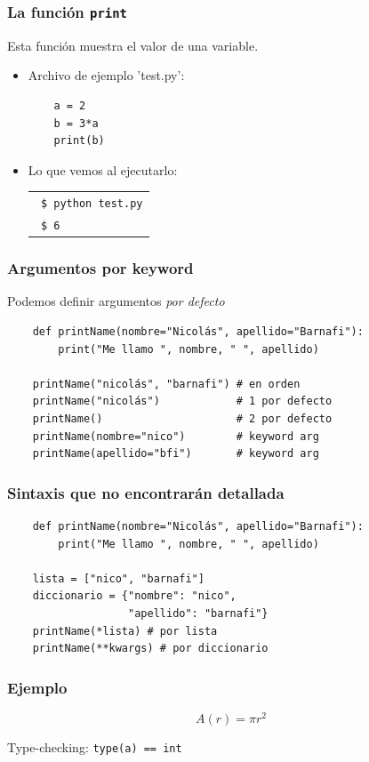 \documentclass[14pt,aspectratio=169,xcolor=dvipsnames]{beamer}
\begin{document}
\begin{frame}[fragile]\frametitle{La función \texttt{print}}
Esta función muestra el valor de una variable. 
\begin{itemize}
    \item Archivo de ejemplo 'test.py':
    \begin{verbatim}
    a = 2
    b = 3*a
    print(b)
    \end{verbatim}
    \item Lo que vemos al ejecutarlo: 

        \begin{tabular}{l}
            \texttt{ \$ python test.py} \\
            \texttt{ \$ 6}
        \end{tabular}
\end{itemize}

\end{frame}
\begin{frame}[fragile]\frametitle{Argumentos por keyword}
    Podemos definir argumentos \emph{por defecto}
    \begin{verbatim}
    def printName(nombre="Nicolás", apellido="Barnafi"):
        print("Me llamo ", nombre, " ", apellido)

    printName("nicolás", "barnafi") # en orden
    printName("nicolás")            # 1 por defecto
    printName()                     # 2 por defecto
    printName(nombre="nico")        # keyword arg
    printName(apellido="bfi")       # keyword arg
    \end{verbatim}
\end{frame}
\begin{frame}[fragile]\frametitle{Sintaxis que no encontrarán detallada}
    \begin{verbatim}
    def printName(nombre="Nicolás", apellido="Barnafi"):
        print("Me llamo ", nombre, " ", apellido)

    lista = ["nico", "barnafi"]
    diccionario = {"nombre": "nico", 
                   "apellido": "barnafi"}
    printName(*lista) # por lista
    printName(**kwargs) # por diccionario
    \end{verbatim}

\end{frame}
\begin{frame}\frametitle{Ejemplo}

$$ A(r) = \pi r^2 $$

\vspace{1cm}
\pause Type-checking: \texttt{type(a) == int}
\end{frame}
\end{document}
